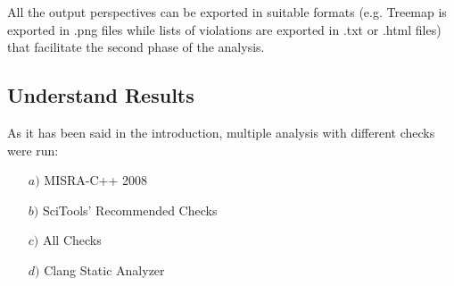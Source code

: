 All the output perspectives can be exported in suitable formats (e.g. Treemap is exported in .png files while lists of violations are exported in .txt or .html files) that facilitate the second phase of the analysis.

\subsection{Understand Results}

As it has been said in the introduction, multiple analysis with different checks were run:
\begin{itemize}
	\item[$a)$] MISRA-C++ 2008
	\item[$b)$] SciTools' Recommended Checks
	\item[$c)$] All Checks
	\item[$d)$] Clang Static Analyzer
\end{itemize}


